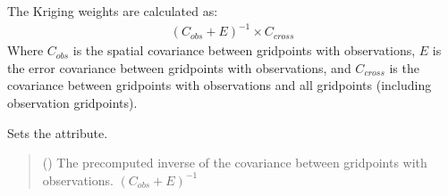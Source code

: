 \documentclass[letterpaper,10pt,english]{sphinxmanual}
\begin{document}
\begin{fulllineitems}
\begin{fulllineitems}
\sphinxAtStartPar
The Kriging weights are calculated as:
\begin{equation*}
\begin{split}(C_{obs} + E)^{-1} \times C_{cross}\end{split}
\end{equation*}
\sphinxAtStartPar
Where \(C_{obs}\) is the spatial covariance between grid\sphinxhyphen{}points
with observations, \(E\) is the error covariance between grid\sphinxhyphen{}points
with observations, and \(C_{cross}\) is the covariance between
grid\sphinxhyphen{}points with observations and all grid\sphinxhyphen{}points (including observation
grid\sphinxhyphen{}points).

\sphinxAtStartPar
Sets the  attribute.
\begin{quote}\begin{description}
\sphinxAtStartPar
{} () \textendash{} The pre\sphinxhyphen{}computed inverse of the covariance between grid\sphinxhyphen{}points with
observations. \((C_{obs} + E)^{-1}\)

\sphinxAtStartPar
{}

\end{description}\end{quote}

\end{fulllineitems}



\end{fulllineitems}
\end{document}
